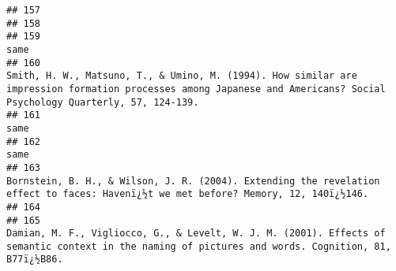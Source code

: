 \documentclass[
  english,
  man]{apa6}
\begin{document}
\begin{verbatim}
## 157                                                                                                                                                                                                                                                                                                                    
## 158                                                                                                                                                                                                                                                                                                                    
## 159                                                                                                                                                                                                                                                                                                                same
## 160                                                                                                                                               Smith, H. W., Matsuno, T., & Umino, M. (1994). How similar are impression formation processes among Japanese and Americans? Social Psychology Quarterly, 57, 124-139.
## 161                                                                                                                                                                                                                                                                                                                same
## 162                                                                                                                                                                                                                                                                                                                same
## 163                                                                                                                                                                                 Bornstein, B. H., & Wilson, J. R. (2004). Extending the revelation effect to faces: Havenï¿½t we met before? Memory, 12, 140ï¿½146.
## 164                                                                                                                                                                                                                                                                                                                    
## 165                                                                                                                                                                 Damian, M. F., Vigliocco, G., & Levelt, W. J. M. (2001). Effects of semantic context in the naming of pictures and words. Cognition, 81, B77ï¿½B86.

\end{verbatim}
\end{document}
